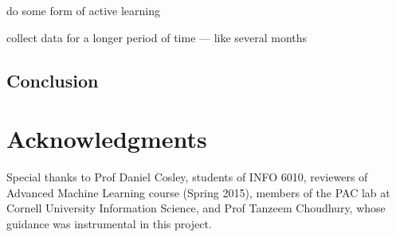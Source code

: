 \documentclass{article}
\begin{document}
do some form of active learning

collect data for a longer period of time --- like several months


\subsection{Conclusion}

\section*{Acknowledgments} 
Special thanks to Prof Daniel Cosley, students of INFO 6010, reviewers of Advanced Machine Learning course (Spring 2015), members of the PAC lab at Cornell University Information Science, and Prof Tanzeem Choudhury, whose guidance was instrumental in this project. 




\end{document}
